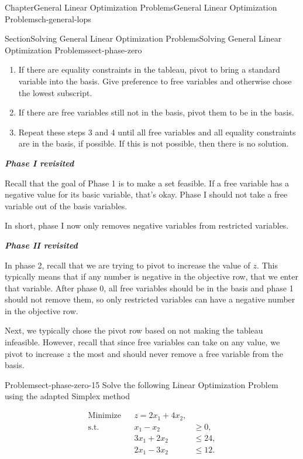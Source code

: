 \documentclass[oneside,10pt,]{book}
\newcommand{\alert}[1]{\textbf{\textit{#1}}}
\numberwithin{equation}{section}
\newcommand{\amp}{&}
\begin{document}
\begin{chapterptx}{Chapter}{General Linear Optimization Problems}{}{General Linear Optimization Problems}{}{}{ch-general-lops}
\begin{sectionptx}{Section}{Solving General Linear Optimization Problems}{}{Solving General Linear Optimization Problems}{}{}{sect-phase-zero}
\begin{enumerate}
\item{}If there are equality constraints in the tableau, pivot to bring a standard variable into the basis. Give preference to free variables and otherwise chose the lowest subscript.%
\item{}If there are free variables still not in the basis, pivot them to be in the basis.%
\item{}Repeat these steps 3 and 4 until all free variables and all equality constraints are in the basis, if possible. If this is not possible, then there is no solution.%
\end{enumerate}
%
\par
\alert{Phase I revisited}%
\par
Recall that the goal of Phase 1 is to make a set feasible. If a free variable has a negative value for its basic variable, that's okay. Phase I should not take a free variable out of the basis variables.%
\par
In short, phase I now only removes negative variables from restricted variables.%
\par
\alert{Phase II revisited}%
\par
In phase 2, recall that we are trying to pivot to increase the value of \(z\). This typically means that if any number is negative in the objective row, that we enter that variable. After phase 0, all free variables should be in the basis and phase 1 should not remove them, so only restricted variables can have a negative number in the objective row.%
\par
Next, we typically chose the pivot row based on not making the tableau infeasible. However, recall that since free variables can take on any value, we pivot to increase \(z\) the most and should never remove a free variable from the basis.%
\begin{problem}{Problem}{}{sect-phase-zero-15}%
Solve the following Linear Optimization Problem using the adapted Simplex method%
\par
%
\begin{equation*}
\begin{aligned} \text{Minimize} \amp\amp z = 2x_1 + 4x_2, \amp \\ \text{s.t.} \amp\amp x_1 - x_2 \amp \geq 0, \\ \amp\amp3x_1 + 2x_2 \amp \leq 24, \\ \amp\amp 2x_1 - 3x_2 \amp \leq 12.
\end{aligned}
\end{equation*}
%
\end{problem}

\end{sectionptx}
\end{chapterptx}
\end{document}
